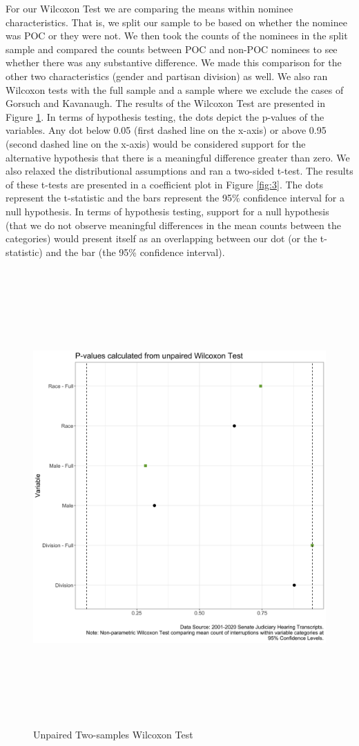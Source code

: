 \documentclass [12pt]{article}
\begin{document}
For our Wilcoxon Test we are comparing the means within nominee characteristics. That is, we split our sample to be based on whether the nominee was POC or they were not. We then took the counts of the nominees in the split sample and compared the counts between POC and non-POC nominees to see whether there was any substantive difference. We made this comparison for the other two characteristics (gender and partisan division) as well. We also ran Wilcoxon tests with the full sample and a sample where we exclude the cases of Gorsuch and Kavanaugh. The results of the Wilcoxon Test are presented in Figure \ref{fig:wilcox}. In terms of hypothesis testing, the dots depict the p-values of the variables. Any dot below 0.05 (first dashed line on the x-axis) or above 0.95 (second dashed line on the x-axis) would be considered support for the alternative hypothesis that there is a meaningful difference greater than zero. We also relaxed the distributional assumptions and ran a two-sided t-test. The results of these t-tests are presented in a coefficient plot in Figure \ref{fig:3}. The dots represent the t-statistic and the bars represent the 95\% confidence interval for a null hypothesis. In terms of hypothesis testing, support for a null hypothesis (that we do not observe meaningful differences in the mean counts between the categories) would present itself as an overlapping between our dot (or the t-statistic) and the bar (the 95\% confidence interval). 
	   	    \begin{figure}[H]
	        \centering
	        \includegraphics[height = 175mm, width = 175mm]{../tables_figures/wilcox-test.png}
	        \caption{Unpaired Two-samples Wilcoxon Test}
	        \label{fig:wilcox}
	    \end{figure}
\end{document}
